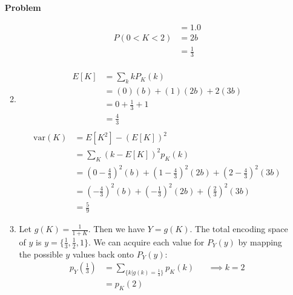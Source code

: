 \documentclass[12pt]{article}
\newenvironment{Ex}{\textbf{Problem}\vspace{.75em}\\}{}
\begin{document}
\begin{enumerate}
\begin{Ex}
\begin{solution}
\begin{enumerate}
\begin{equation}
\begin{aligned}
              &= 1.0 \\
              P(0<K<2) &= 2b \\
              &= \frac{1}{3} \\
            \end{aligned}
          \end{equation}
        \item
          \begin{equation}
            \label{eq:1c-expected-sol}
            \begin{aligned}
              E[K] &= \sum_k k P_K(k) \\
              &= (0)(b) + (1)(2b) + 2(3b) \\
              &= 0 + \frac{1}{3} + 1 \\
              &= \frac{4}{3} \\
            \end{aligned}
          \end{equation}
          \begin{equation}
            \label{eq:1c-variance-sol}
            \begin{aligned}
              \text{var}(K) &= E[K^2] - (E[K])^2 \\
              &= \sum_K(k-E[K])^2p_K(k) \\
              &= \left(0 - \frac{4}{3}\right)^2(b) +
              \left(1 - \frac{4}{3}\right)^2(2b) +
              \left(2 - \frac{4}{3}\right)^2(3b) \\
              &= \left(-\frac{4}{3}\right)^2(b) +
              \left(-\frac{1}{3}\right)^2(2b) +
              \left(\frac{2}{3}\right)^2(3b) \\
              &= \frac{5}{9}
            \end{aligned}
          \end{equation}
        \item Let $g(K) = \frac{1}{1+K}$. Then we have $Y=g(K)$. The
          total encoding space of $y$ is $y = \{\frac{1}{3},
          \frac{1}{2}, 1\}$. We can acquire each value for $P_Y(y)$ by
          mapping the possible $y$ values back onto $P_Y(y)$:
          \begin{equation}
            \label{eq:1d-pmf}
            \begin{aligned}
              p_Y\left(\frac{1}{3}\right) &= \sum_{\{k | g(k) =
                \frac{1}{3}\}}p_K(k) && \implies k = 2 \\
              &= p_K(2) \\

\end{aligned}
\end{equation}
\end{enumerate}
\end{solution}
\end{Ex}
\end{enumerate}
\end{document}
